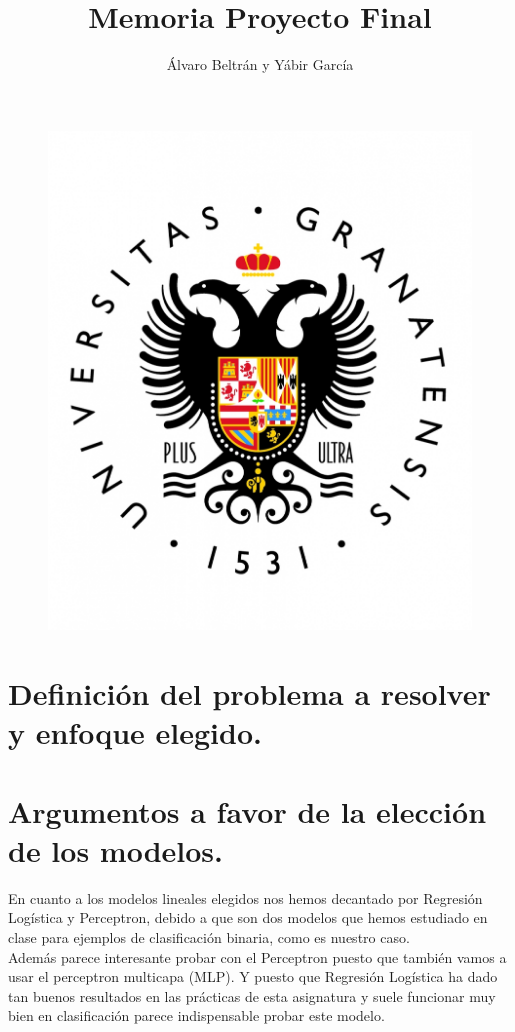 \documentclass[a4paper,11pt]{article}
\title{Memoria Proyecto Final}
\author{Álvaro Beltrán y Yábir García}
\begin{document}
\maketitle

\begin{figure}[h]
\includegraphics[scale=0.3]{UGR}
\centering
\end{figure}

\newpage

\renewcommand*\contentsname{Índice}
\tableofcontents

\newpage

\section{Definición del problema a resolver y enfoque elegido.}

\section{Argumentos a favor de la elección de los modelos.}

En cuanto a los modelos lineales elegidos nos hemos decantado por Regresión Logística y Perceptron, debido a que son dos modelos que hemos estudiado en clase para ejemplos de clasificación binaria, como es nuestro caso. \\

Además parece interesante probar con el Perceptron puesto que también vamos a usar el perceptron multicapa (MLP). Y puesto que Regresión Logística ha dado tan buenos resultados en las prácticas de esta asignatura y suele funcionar muy bien en clasificación parece indispensable probar este modelo.
\end{document}
